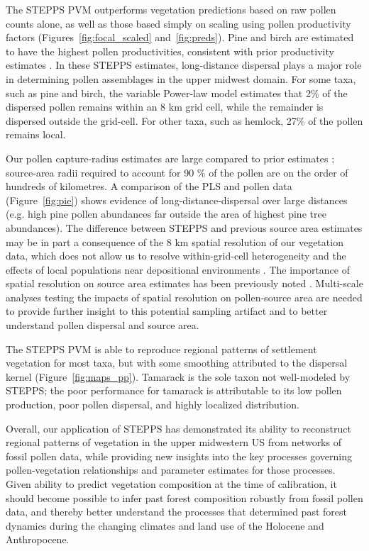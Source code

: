\documentclass[12pt]{article}
\begin{document}
The STEPPS PVM outperforms vegetation predictions based on raw pollen
counts alone, as well as those based simply on scaling using pollen
productivity factors (Figures~\ref{fig:focal_scaled}
and~\ref{fig:preds}). Pine and birch are estimated to have the highest
pollen productivities, consistent with prior productivity estimates
\citep{bradshaw1985relationships, prentice1986}. In these STEPPS
estimates, long-distance dispersal plays a major role in determining
pollen assemblages in the upper midwest domain. For some taxa, such as
pine and birch, the variable Power-law model estimates that 2\% of the
dispersed pollen remains within an 8 km grid cell, while the remainder
is dispersed outside the grid-cell. For other taxa, such as hemlock,
27\% of the pollen remains local.

Our pollen capture-radius estimates are large compared to prior
estimates
\citep{sugita2007theory2,sugita1994pollen,williams2003palynological,prentice1987quantitative,bradshaw1985relationships};
source-area radii required to account for 90 \% of the pollen are on
the order of hundreds of kilometres. A comparison of the PLS and
pollen data (Figure~\ref{fig:pie}) shows evidence of
long-distance-dispersal over large distances (e.g. high pine pollen
abundances far outside the area of highest pine tree abundances). The
difference between STEPPS and previous source area estimates may be in
part a consequence of the 8 km spatial resolution of our vegetation
data, which does not allow us to resolve within-grid-cell
heterogeneity and the effects of local populations near depositional
environments \citep{jacobson1981selection, bradshaw1985relationships,
  jackson1990}. The importance of spatial resolution on source area
estimates has been previously noted
\citep{sugita1994pollen}. Multi-scale analyses testing the impacts of
spatial resolution on pollen-source area are needed to provide further
insight to this potential sampling artifact and to better understand
pollen dispersal and source area.

The STEPPS PVM is able to reproduce regional patterns of settlement
vegetation for most taxa, but with some smoothing attributed to the
dispersal kernel (Figure~\ref{fig:maps_pp}). Tamarack is the sole
taxon not well-modeled by STEPPS; the poor performance for tamarack is
attributable to its low pollen production, poor pollen dispersal, and
highly localized distribution.

Overall, our application of STEPPS has demonstrated its ability to
reconstruct regional patterns of vegetation in the upper midwestern US
from networks of fossil pollen data, while providing new insights into
the key processes governing pollen-vegetation relationships and
parameter estimates for those processes. Given ability to predict
vegetation composition at the time of calibration, it should become
possible to infer past forest composition robustly from fossil pollen
data, and thereby better understand the processes that determined past
forest dynamics during the changing climates and land use of the
Holocene and Anthropocene.
\end{document}
